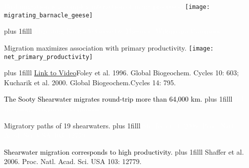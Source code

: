 \documentclass[t]{beamer}
\newcommand\imagecredit[1]{%
	\vskip0pt plus 1filll \tiny #1}%
\begin{document}

{
\begin{frame}[t,plain]{\textcolor{white}{Bird migration is a complex interaction of many processes.}}
	\centering
		\texttt{[image: migrating\_barnacle\_geese]}

	\imagecredit{\hfill\textcolor{white}{Migrating Barnacle Geese by Thermos, Wikimedia Commons.}}
\end{frame}
}


{
\begin{frame}[t,plain]{Migration maximizes association with primary productivity.}
	\centering
		\texttt{[image: net\_primary\_productivity]}

	\imagecredit{\href{https://www.youtube.com/watch?v=SulCktsf_PU}{Link to Video}\hfill Foley et al. 1996. Global Biogeochem. Cycles 10: 603;  Kucharik et al. 2000. Global Biogeochem.Cycles 14: 795.}
\end{frame}
}

{
\begin{frame}[t,plain]{\textcolor{black}{The Sooty Shearwater migrates round-trip more than 64,000 km.}}
	\imagecredit{\hfill\textcolor{white}{J.J. Harrison, Wikimedia Commons}}
\end{frame}
}

{
\begin{frame}[t,plain]{Migratory paths of 19 shearwaters.}
	\imagecredit{\hfill\textcolor{white}{Shaffer et al. 2006. Proc. Natl. Acad. Sci. USA 103: 12779.}}
\end{frame}
}

{
\begin{frame}[t,plain]{\textcolor{black}{Shearwater migration corresponds to high productivity.}}
	\imagecredit{Shaffer et al. 2006. Proc. Natl. Acad. Sci. USA 103: 12779.}
\end{frame}
}

\end{document}
